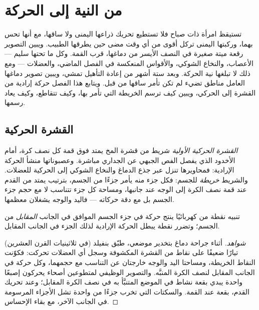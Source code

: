 \chapter{من النية إلى الحركة}\label{ch:g12:brain-and-movement}

تستيقظ امرأة ذات صباح فلا تستطيع تحريك ذراعها اليمنى ولا ساقها، مع أنها
تحس بهما، وركبتها اليمنى تركل أقوى من أي وقت مضى حين يطرقها الطبيب.
ويبين التصوير رقعة ميتة صغيرة في النصف الأيسر من دماغها، قرب القمة.
وكل ما تحتها سليم --- الأعصاب، والنخاع الشوكي، والأقواس المنعكسة في
الفصل الماضي، والعضلات --- ومع ذلك لا تبلغها نية الحركة. وبعد ستة أشهر
من إعادة التأهيل تمشي، ويبين تصوير دماغها العامل مناطق تضيء لم تكن
تأمر ساقها من قبل. ويتابع هذا الفصل حركة إرادية من القشرة إلى 
الحركي، ويبين كيف ترسم الخريطة التي تأمر بها، وكيف تتقاطع، وكيف يعاد
رسمها.

\section{القشرة الحركية}

\begin{definition}\label{def:g12:brain-and-movement:cortex}
\emph{القشرة الحركية الأولية} شريط من قشرة المخ يمتد
فوق قمة كل نصف كرة، أمام الأخدود الذي يفصل الفص الجبهي عن الجداري
مباشرة. وعصبوناتها منشأ الحركة الإرادية: فمحاويرها تنزل عبر جذع الدماغ
والنخاع الشوكي إلى  الحركية للعضلات. والشريط \emph{خريطة}
للجسم: فكل جزء منه يأمر جزءًا من الجسم، بترتيب يمتد من القدم عند قمة
نصف الكرة إلى الوجه عند جانبها، ومساحة كل جزء تتناسب لا مع حجم جزء
الجسم بل مع دقة حركاته --- فاليد والوجه يشغلان معظمها.
\end{definition}

\begin{proposition}\label{prop:g12:brain-and-movement:map}
تنبيه نقطة من  كهربائيًا ينتج حركة في جزء الجسم الموافق
في الجانب \emph{المقابل} من الجسم؛ وتضرر نقطة يبطل الحركة الإرادية
لذلك الجزء في الجانب المقابل.
\end{proposition}
\begin{proof}[شواهد]
أثناء جراحة دماغ بتخدير موضعي، طبّق بنفيلد (في ثلاثينيات القرن العشرين)
تيارًا ضعيفًا على نقاط من القشرة المكشوفة وسجل أي العضلات تحركت: فكوّنت
النقاط الخريطة، ومساحتا اليد والوجه خارجتان عن التناسب مع حجمهما، وكل
حركة في الجانب المقابل لنصف الكرة المنبَّه. والتصوير الوظيفي لمتطوعين
أصحاء يحركون إصبعًا واحدة يبدي بقعة نشاط في الموضع المتنبَّأ به في نصف
الكرة المقابل؛ وعند تحريك القدم، بقعة عند القمة. والسكتات التي تخرب
جزءًا من  واحدة تشل الأجزاء المرسومة في الجانب الآخر، مع بقاء
الإحساس.
\end{proof}

